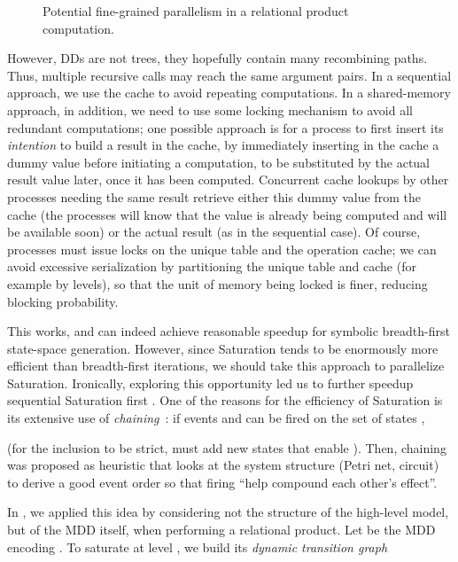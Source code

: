 \documentclass[copyright,creativecommons]{eptcs}
\newcommand{\CENTERPSSCALE}[2]{\begin{center}\mbox{\epsfig{file=#1.eps, scale=#2}}\end{center}}
\begin{document}
\begin{figure}
\begin{center}
\CENTERPSSCALE{pardis-fine-grain}{0.74}
\end{center}
\caption{Potential fine-grained parallelism in a relational product computation.}
\label{FIG:pardis-fine-grain}
\end{figure}


However, DDs are not trees, they hopefully contain many
recombining paths. Thus, multiple recursive calls may reach the same
argument pairs.
In a sequential approach, we use the cache
to avoid repeating computations. In a shared-memory approach, in
addition, we need to use some locking mechanism to avoid all
redundant computations; one possible approach is for a process to
first insert its \emph{intention} to build a result in the cache, by
immediately inserting in the cache a dummy value before initiating a
computation, to be substituted by the actual result value later,
once it has been computed.
Concurrent cache lookups by other processes needing the same result
retrieve either this dummy value from the cache
(the processes will know that the value is
already being computed and will be available soon) or the actual
result (as in the sequential case).
Of course, processes must issue locks on the unique table and the operation
cache; we can avoid excessive serialization by partitioning
the unique table and cache (for example by levels),
so that the unit of memory being locked is finer, reducing blocking probability.

This works, and can indeed achieve reasonable speedup for symbolic
breadth-first state-space generation.
However, since Saturation tends to be enormously more efficient than
breadth-first iterations, we should take this approach to
parallelize Saturation. Ironically, exploring this opportunity led
us to further speedup sequential Saturation first
\cite{2006ATVA-Chaining}. One of the reasons for the efficiency of
Saturation is its extensive use of \emph{chaining}~\cite{Roig1995}:
if events  and  can be fired on the set of states
,

(for the inclusion to be strict,  must add new states that
enable ).
Then, chaining was proposed as heuristic that looks at the system structure
(Petri net, circuit) to derive a good event order so that firing
``help compound each other's effect''.

In \cite{2006ATVA-Chaining}, we applied this idea by considering
not the structure of the high-level model, but of the MDD itself,
when performing a relational product.
Let  be the MDD encoding
.
To saturate  at level , we build its \emph{dynamic transition graph}
\end{document}

